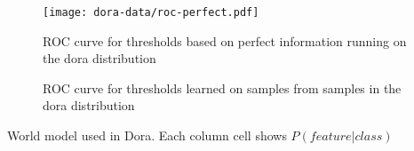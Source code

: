 \documentclass[a4paper]{article}
\begin{document}
\begin{figure}
\centering
\texttt{[image: dora-data/roc-perfect.pdf]}
\caption{\label{tab:dora-data-perfect}ROC curve for thresholds based on perfect information running on the dora distribution}
\end{figure}


\begin{figure}
\centering

\caption{\label{tab:dora-data-simple}ROC curve for thresholds learned on samples from samples in the dora distribution}
\end{figure}

\begin{sidewaystable}[h]
\begin{center}
\scalebox{0.35}{

}
\end{center}
\caption{\label{tab:dora-world-distribution}World model used in Dora. Each column cell shows $P(feature|class)$}
\end{sidewaystable}

\cleardoublepage
{}
{}



\end{document}
